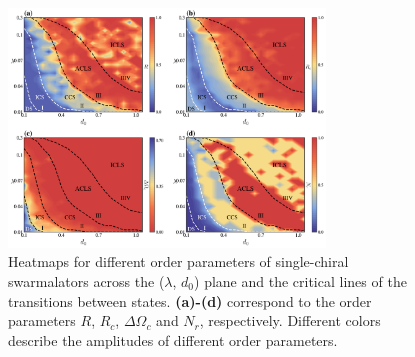 \documentclass{article}
\begin{document}




\newpage
\begin{figure}[H]
    \centering
    \includegraphics[width=0.75\textwidth]{./figs/monoOrderParam.png}
    \caption{
        \label{fig:monoOrderParam} Heatmaps for different order parameters of single-chiral swarmalators across the ($\lambda$, $d_0$) plane and the critical lines of the transitions between states.
        \textbf{(a)-(d)} correspond to the order parameters $R$, $R_c$, $\Delta \Omega_c$ and $N_r$, respectively.
        Different colors describe the amplitudes of different order parameters.
    }
\end{figure}
\end{document}
